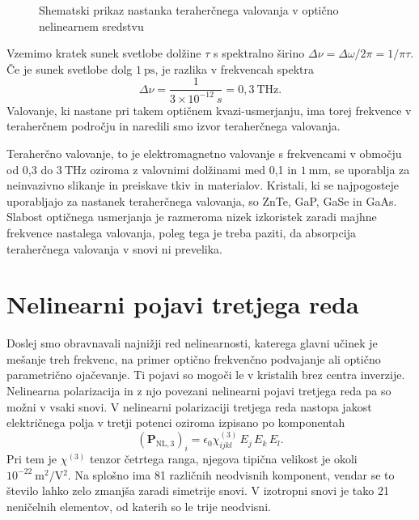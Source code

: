 \begin{figure}[ht]
\centering
\def\svgwidth{100truemm} 

\caption{Shematski prikaz nastanka teraherčnega valovanja v optično nelinearnem sredstvu}
\label{fig:THz}
\end{figure}

Vzemimo kratek sunek svetlobe dolžine $\tau$ s spektralno širino
$\Delta \nu = \Delta \omega/2 \pi = 1/\pi \tau$.
Če je sunek svetlobe dolg $1~\si{\pico\second}$, je razlika v frekvencah 
spektra 
\begin{equation}
\Delta \nu = \frac{1}{3 \times 10^{-12}~\si{s}} = 0,3~\si{\tera\hertz}.
\end{equation}
Valovanje, ki nastane pri takem optičnem kvazi-usmerjanju, ima torej frekvence v teraherčnem
področju in naredili smo izvor teraherčnega valovanja. 

Teraherčno valovanje, to je 
elektromagnetno valovanje s frekvencami v območju od 0,3 do $3~\si{\tera\hertz}$
oziroma z valovnimi dolžinami med 0,1 in $1~\si{\milli\metre}$, 
se uporablja za neinvazivno slikanje in preiskave tkiv in materialov. Kristali, ki 
se najpogosteje uporabljajo za nastanek teraherčnega valovanja, so ZnTe, 
GaP, GaSe in GaAs. Slabost optičnega usmerjanja je razmeroma nizek izkoristek zaradi majhne frekvence
 nastalega valovanja, poleg tega je treba paziti, da absorpcija teraherčnega valovanja
 v snovi ni prevelika.  

\section{Nelinearni pojavi tretjega reda}
Doslej smo obravnavali najnižji red nelinearnosti, katerega glavni
učinek je mešanje treh frekvenc, na primer optično frekvenčno podvajanje ali
optično parametrično ojačevanje. Ti pojavi so mogoči le v kristalih brez centra
inverzije. Nelinearna polarizacija in z njo povezani nelinearni pojavi tretjega reda pa so
možni v vsaki snovi. 
V nelinearni polarizaciji tretjega reda nastopa jakost električnega polja v tretji potenci
oziroma izpisano po komponentah
\begin{equation}
\left(\mathbf{P}_{\mathrm{NL,3}}\right)_i= \epsilon_{0}\chi^{(3)}_{ijkl} \,E_j \,E_k\, E_l.
\end{equation}
Pri tem je $\chi^{(3)}$ tenzor četrtega ranga, njegova tipična velikost je okoli 
$10^{-22}~\si{\metre^2/\volt^2}$. Na splošno ima 81 različnih neodvisnih komponent, vendar se to
število lahko zelo zmanjša zaradi simetrije snovi. V izotropni snovi je tako
21 neničelnih elementov, od katerih so le trije neodvisni. 

